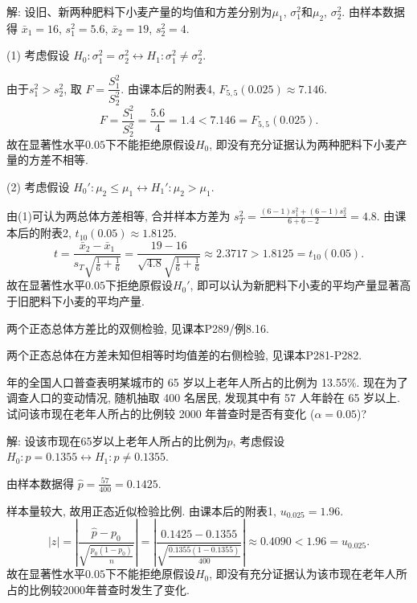 \documentclass[standard]{ExBook}
\renewenvironment{shaded}{%
  \def\FrameCommand{\fboxsep=\FrameSep \colorbox{shadecolor}}%
  \MakeFramed{\advance\hsize-\width \FrameRestore}%
}{%
  \endMakeFramed
}
\begin{document}
\begin{qitems}
解: 设旧、新两种肥料下小麦产量的均值和方差分别为$\mu_1$, $\sigma_1^2$和$\mu_2$, $\sigma_2^2$. 由样本数据得
$
\bar{x}_1=16
$,
$
s_1^2=5.6
$,
$
\bar{x}_2=19
$,
$
s_2^2=4
$.

(1) 考虑假设
$
H_0:\sigma_1^2=\sigma_2^2
\longleftrightarrow
H_1:\sigma_1^2\neq\sigma_2^2
$.

由于$s_1^2>s_2^2$, 取
$
F=\dfrac{S_1^2}{S_2^2}
$.
由课本后的附表4, $F_{5,5}(0.025)\approx7.146$.
$$
F
=
\frac{S_1^2}{S_2^2}
=
\frac{5.6}{4}
=
1.4
<
7.146
=
F_{5,5}(0.025).
$$
故在显著性水平$0.05$下不能拒绝原假设$H_0$, 即没有充分证据认为两种肥料下小麦产量的方差不相等.

(2) 考虑假设
$
H_0':\mu_2\leq\mu_1
\longleftrightarrow
H_1':\mu_2>\mu_1
$.

由(1)可认为两总体方差相等, 合并样本方差为
$
s_T^2
=
\frac{(6-1)s_1^2+(6-1)s_2^2}{6+6-2}
=4.8
$.
由课本后的附表2, $t_{10}(0.05)\approx1.8125$.
$$
t
=
\frac{\bar{x}_2-\bar{x}_1}
{s_T\sqrt{\frac{1}{6}+\frac{1}{6}}}
=
\frac{19-16}
{\sqrt{4.8}\sqrt{\frac{1}{6}+\frac{1}{6}}}
\approx2.3717
>
1.8125
=
t_{10}(0.05).
$$
故在显著性水平$0.05$下拒绝原假设$H_0'$, 即可以认为新肥料下小麦的平均产量显著高于旧肥料下小麦的平均产量.

\textcolor{themeColor}{\selectfont {} 两个正态总体方差比的双侧检验, 见课本P289/例8.16.}

\textcolor{themeColor}{\selectfont {} 两个正态总体在方差未知但相等时均值差的右侧检验, 见课本P281-P282.}

\vspace{2.5cm-5em}

    \begin{bbox}
    \begin{shaded}
         年的全国人口普查表明某城市的 65 岁以上老年人所占的比例为 13.55\%. 现在为了调查人口的变动情况, 随机抽取 400 名居民, 发现其中有 57 人年龄在 65 岁以上. 试问该市现在老年人所占的比例较 2000 年普查时是否有变化 ($\alpha=0.05$)?
    \end{shaded}
    \end{bbox}

\vspace{\dimexpr2.5cm-5em\relax}

解: 设该市现在65岁以上老年人所占的比例为$p$, 考虑假设
$
H_0:p=0.1355
\longleftrightarrow
H_1:p\neq0.1355
$.

由样本数据得
$
\hat{p}=\frac{57}{400}=0.1425
$.

样本量较大, 故用正态近似检验比例. 由课本后的附表1, $u_{0.025}=1.96$.
$$
|z|
=
\left|
\frac{\hat{p}-p_0}
{\sqrt{\frac{p_0(1-p_0)}{n}}}
\right|
=
\left|
\frac{0.1425-0.1355}
{\sqrt{\frac{0.1355(1-0.1355)}{400}}}
\right|
\approx0.4090
<
1.96
=
u_{0.025}.
$$
故在显著性水平$0.05$下不能拒绝原假设$H_0$, 即没有充分证据认为该市现在老年人所占的比例较2000年普查时发生了变化.


\end{qitems}
\end{document}
